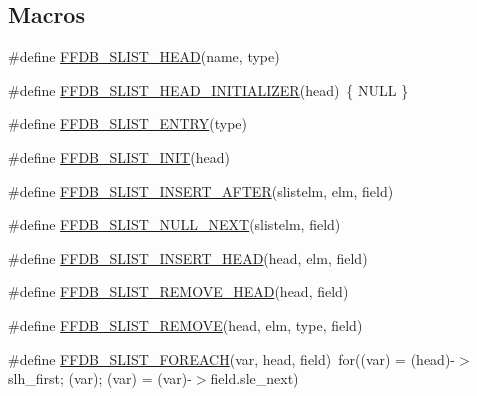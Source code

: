 \subsection*{Macros}
\begin{DoxyCompactItemize}
\item 
\#define \mbox{\hyperlink{adat-devel_2other__libs_2filedb_2filehash_2ffdb__cq_8h_af42e68975bac1d523c3c0fbc88250424}{F\+F\+D\+B\+\_\+\+S\+L\+I\+S\+T\+\_\+\+H\+E\+AD}}(name,  type)
\item 
\#define \mbox{\hyperlink{adat-devel_2other__libs_2filedb_2filehash_2ffdb__cq_8h_af98e95c30c156c3ad59e5aec4081fa42}{F\+F\+D\+B\+\_\+\+S\+L\+I\+S\+T\+\_\+\+H\+E\+A\+D\+\_\+\+I\+N\+I\+T\+I\+A\+L\+I\+Z\+ER}}(head)~\{ N\+U\+LL \}
\item 
\#define \mbox{\hyperlink{adat-devel_2other__libs_2filedb_2filehash_2ffdb__cq_8h_a2e31500f2c8eef196f7aa17f1223068a}{F\+F\+D\+B\+\_\+\+S\+L\+I\+S\+T\+\_\+\+E\+N\+T\+RY}}(type)
\item 
\#define \mbox{\hyperlink{adat-devel_2other__libs_2filedb_2filehash_2ffdb__cq_8h_ad7f74f5b75af52a9e3dfe6a4e46338bc}{F\+F\+D\+B\+\_\+\+S\+L\+I\+S\+T\+\_\+\+I\+N\+IT}}(head)
\item 
\#define \mbox{\hyperlink{adat-devel_2other__libs_2filedb_2filehash_2ffdb__cq_8h_ae261c7ea4f65e01c040b2fa214b2932f}{F\+F\+D\+B\+\_\+\+S\+L\+I\+S\+T\+\_\+\+I\+N\+S\+E\+R\+T\+\_\+\+A\+F\+T\+ER}}(slistelm,  elm,  field)
\item 
\#define \mbox{\hyperlink{adat-devel_2other__libs_2filedb_2filehash_2ffdb__cq_8h_a7acc97ec110aab21dba00999d57436de}{F\+F\+D\+B\+\_\+\+S\+L\+I\+S\+T\+\_\+\+N\+U\+L\+L\+\_\+\+N\+E\+XT}}(slistelm,  field)
\item 
\#define \mbox{\hyperlink{adat-devel_2other__libs_2filedb_2filehash_2ffdb__cq_8h_ae0facce3230768a4e7d922f76e744198}{F\+F\+D\+B\+\_\+\+S\+L\+I\+S\+T\+\_\+\+I\+N\+S\+E\+R\+T\+\_\+\+H\+E\+AD}}(head,  elm,  field)
\item 
\#define \mbox{\hyperlink{adat-devel_2other__libs_2filedb_2filehash_2ffdb__cq_8h_a75c632f74678e7aefb90c22a68eb5454}{F\+F\+D\+B\+\_\+\+S\+L\+I\+S\+T\+\_\+\+R\+E\+M\+O\+V\+E\+\_\+\+H\+E\+AD}}(head,  field)
\item 
\#define \mbox{\hyperlink{adat-devel_2other__libs_2filedb_2filehash_2ffdb__cq_8h_a8d95f5882bd31e71fa295122e0ae0cfe}{F\+F\+D\+B\+\_\+\+S\+L\+I\+S\+T\+\_\+\+R\+E\+M\+O\+VE}}(head,  elm,  type,  field)
\item 
\#define \mbox{\hyperlink{adat-devel_2other__libs_2filedb_2filehash_2ffdb__cq_8h_a4176eba5d05296cbfc7723b9c6acf788}{F\+F\+D\+B\+\_\+\+S\+L\+I\+S\+T\+\_\+\+F\+O\+R\+E\+A\+CH}}(var,  head,  field)~for((var) = (head)-\/$>$slh\+\_\+first; (var); (var) = (var)-\/$>$field.\+sle\+\_\+next)

\end{DoxyCompactItemize}
